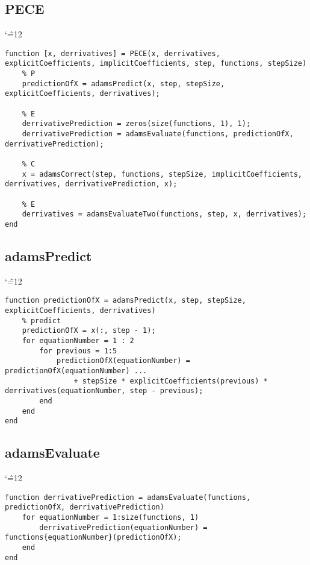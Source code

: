 \documentclass[12pt]{report}
\newenvironment{simplechar}{%
   \catcode`\^=12
}{}
\begin{document}
\subsection{PECE}
\begin{simplechar}
\begin{lstlisting}
function [x, derrivatives] = PECE(x, derrivatives, explicitCoefficients, implicitCoefficients, step, functions, stepSize)
    % P
    predictionOfX = adamsPredict(x, step, stepSize, explicitCoefficients, derrivatives);

    % E
    derrivativePrediction = zeros(size(functions, 1), 1);
    derrivativePrediction = adamsEvaluate(functions, predictionOfX, derrivativePrediction);

    % C
    x = adamsCorrect(step, functions, stepSize, implicitCoefficients, derrivatives, derrivativePrediction, x);

    % E
    derrivatives = adamsEvaluateTwo(functions, step, x, derrivatives);
end
\end{lstlisting}
\end{simplechar}

\subsection{adamsPredict}
\begin{simplechar}
\begin{lstlisting}
function predictionOfX = adamsPredict(x, step, stepSize, explicitCoefficients, derrivatives)
    % predict
    predictionOfX = x(:, step - 1);
    for equationNumber = 1 : 2
        for previous = 1:5
            predictionOfX(equationNumber) = predictionOfX(equationNumber) ...
                + stepSize * explicitCoefficients(previous) * derrivatives(equationNumber, step - previous);
        end
    end
end
\end{lstlisting}
\end{simplechar}

\subsection{adamsEvaluate}
\begin{simplechar}
\begin{lstlisting}
function derrivativePrediction = adamsEvaluate(functions, predictionOfX, derrivativePrediction)
    for equationNumber = 1:size(functions, 1)
        derrivativePrediction(equationNumber) = functions{equationNumber}(predictionOfX);
    end
end
\end{lstlisting}
\end{simplechar}
\end{document}
